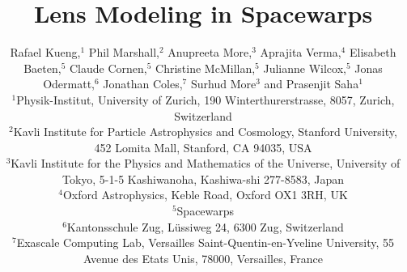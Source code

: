 \documentclass[usenatbib]{mn2e}
\newcommand{\sw}{Spacewarps\xspace}
\begin{document}
\title{Lens Modeling in \sw}

\author[Kueng et al]{Rafael Kueng,$^{1}$
Phil Marshall,$^{2}$
Anupreeta More,$^{3}$
Aprajita Verma,$^{4}$
\newauthor
Elisabeth Baeten,$^{5}$
Claude Cornen,$^{5}$
Christine McMillan,$^{5}$
Julianne Wilcox,$^{5}$
\newauthor
Jonas Odermatt,$^{6}$
Jonathan Coles,$^{7}$
Surhud More$^{3}$
and Prasenjit Saha$^{1}$ \\
$^{1}$Physik-Institut, University of Zurich, 190 Winterthurerstrasse, 8057, Zurich, Switzerland\\
$^{2}$Kavli Institute for Particle Astrophysics and Cosmology, Stanford University, 452 Lomita Mall, Stanford, CA 94035, USA\\
$^{3}$Kavli Institute for the Physics and Mathematics of the Universe, University of Tokyo, 5-1-5 Kashiwanoha, Kashiwa-shi 277-8583, Japan\\
$^{4}$Oxford Astrophysics, Keble Road, Oxford OX1 3RH, UK\\
$^{5}$Spacewarps\\
$^{6}$Kantonsschule Zug, L\"ussiweg 24, 6300 Zug, Switzerland\\
$^{7}$Exascale Computing Lab, Versailles Saint-Quentin-en-Yveline University, 55 Avenue des Etats Unis, 78000, Versailles, France}


\maketitle









\end{document}
